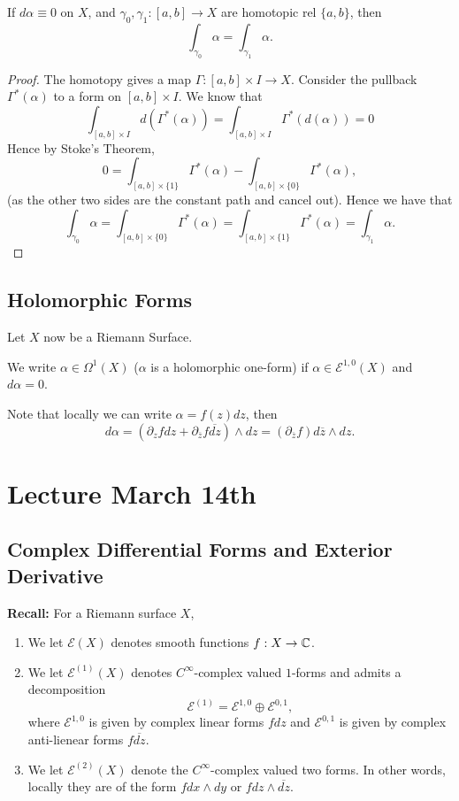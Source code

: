\documentclass{article}
\begin{document}
{\begin{proposition}
    If $d \alpha \equiv 0$ on $X$, and $\gamma_0, \gamma_1: [a, b] \to X$ are homotopic rel $\{a, b\}$, then
    \[\int_{\gamma_0} \alpha = \int_{\gamma_1} \alpha.\]
\end{proposition}

\begin{proof}
    The homotopy gives a map $\Gamma: [a, b] \times I \to X$. Consider the pullback $\Gamma^*(\alpha)$ to a form on $[a, b] \times I$. We know that
    \[\int_{[a, b] \times I} d(\Gamma^*(\alpha)) = \int_{[a, b] \times I} \Gamma^*(d(\alpha)) = 0 \]
    Hence by Stoke's Theorem,
    \[0 = \int_{[a, b] \times \{1\}} \Gamma^*(\alpha) - \int_{[a, b] \times \{0\}} \Gamma^*(\alpha),\]
    (as the other two sides are the constant path and cancel out). Hence we have that
    \[\int_{\gamma_0} \alpha = \int_{[a, b] \times \{0\}} \Gamma^*(\alpha) =  \int_{[a, b] \times \{1\}} \Gamma^*(\alpha) = \int_{\gamma_1} \alpha.\]
\end{proof}

\subsection{Holomorphic Forms}

Let $X$ now be a Riemann Surface.
\begin{definition}
    We  write $\alpha \in \Omega^1(X)$ ($\alpha$ is a holomorphic one-form) if $\alpha \in \mathcal{E}^{1, 0}(X)$ and $d\alpha = 0$.
\end{definition}

Note that locally we can write $\alpha = f(z) dz$, then
\[d\alpha = (\partial_z f dz + \partial_{\overline{z}} f \overline{dz}) \wedge dz = (\partial_{\overline{z}} f) d\overline{z} \wedge dz.\]

\newpage
\section{Lecture March 14th}

\subsection{Complex Differential Forms and Exterior Derivative}
\textbf{Recall:} For a Riemann surface $X$,
\begin{enumerate}
    \item We let $\mathcal{E}(X)$ denotes smooth functions $f: X \to \mathbb{C}$. 
    \item We let $\mathcal{E}^{(1)}(X)$ denotes $C^\infty$-complex valued $1$-forms and admits a decomposition
    \[\mathcal{E}^{(1)} = \mathcal{E}^{1, 0} \oplus \mathcal{E}^{0, 1},\]
    where $\mathcal{E}^{1, 0}$ is given by complex linear forms $f dz$ and $\mathcal{E}^{0, 1}$ is given by complex anti-lienear forms $f \overline{dz}$.
    \item We let $\mathcal{E}^{(2)}(X)$ denote the $C^\infty$-complex valued two forms. In other words, locally they are of the form $f dx \wedge dy$ or $f dz \wedge \overline{dz}$. 
\end{enumerate}

}
\end{document}
